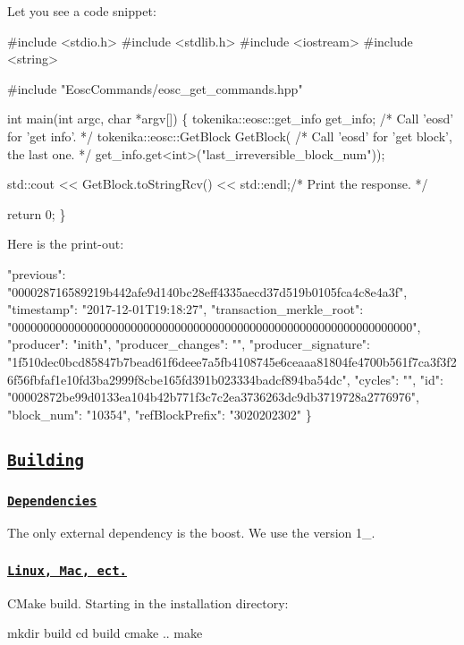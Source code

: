 Let you see a code snippet\+: 
\begin{DoxyCode}
#include <stdio.h>
#include <stdlib.h>
#include <iostream>
#include <string>

#include "EoscCommands/eosc\_get\_commands.hpp"

int main(int argc, char *argv[])
\{
  tokenika::eosc::get\_info get\_info; /* Call 'eosd' for 'get info'. */
  tokenika::eosc::GetBlock GetBlock( /* Call 'eosd' for 'get block', the last one. */
    get\_info.get<int>("last\_irreversible\_block\_num"));

  std::cout << GetBlock.toStringRcv() << std::endl;/* Print the response. */

  return 0;
\}
\end{DoxyCode}
 Here is the print-\/out\+: 
\begin{DoxyCode}
    "previous": "000028716589219b442afe9d140bc28eff4335aecd37d519b0105fca4c8e4a3f",
    "timestamp": "2017-12-01T19:18:27",
    "transaction\_merkle\_root": "0000000000000000000000000000000000000000000000000000000000000000",
    "producer": "inith",
    "producer\_changes": "",
    "producer\_signature":
       "1f510dec0bcd85847b7bead61f6deee7a5fb4108745e6ceaaa81804fe4700b561f7ca3f3f26f56fbfaf1e10fd3ba2999f8cbe165fd391b023334badcf894ba54dc",
    "cycles": "",
    "id": "00002872be99d0133ea104b42b771f3c7c2ea3736263dc9db3719728a2776976",
    "block\_num": "10354",
    "refBlockPrefix": "3020202302"
\}
\end{DoxyCode}


\label{_building}%
 \subsection*{\href{#toc}{\tt Building}}

\label{_dependencies}%
 \subsubsection*{\href{#toc}{\tt Dependencies}}

The only external dependency is the boost. We use the version 1\+\_.

\label{_linux}%
 \subsubsection*{\href{#toc}{\tt Linux, Mac, ect.}}

C\+Make build. Starting in the installation directory\+:


\begin{DoxyCode}
mkdir build
cd build
cmake ..
make
\end{DoxyCode}


